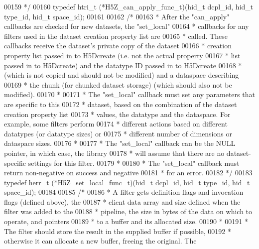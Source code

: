 \begin{DoxyCode}
00159 \textcolor{comment}{ */}
00160 \textcolor{keyword}{typedef} htri\_t (*H5Z\_can\_apply\_func\_t)(hid\_t dcpl\_id, hid\_t type\_id, hid\_t space\_id);
00161 
00162 \textcolor{comment}{/*}
00163 \textcolor{comment}{ * After the "can\_apply" callbacks are checked for new datasets, the "set\_local"}
00164 \textcolor{comment}{ * callbacks for any filters used in the dataset creation property list are}
00165 \textcolor{comment}{ * called.  These callbacks receive the dataset's private copy of the dataset}
00166 \textcolor{comment}{ * creation property list passed in to H5Dcreate (i.e. not the actual property}
00167 \textcolor{comment}{ * list passed in to H5Dcreate) and the datatype ID passed in to H5Dcreate}
00168 \textcolor{comment}{ * (which is not copied and should not be modified) and a dataspace describing}
00169 \textcolor{comment}{ * the chunk (for chunked dataset storage) (which should also not be modified).}
00170 \textcolor{comment}{ *}
00171 \textcolor{comment}{ * The "set\_local" callback must set any parameters that are specific to this}
00172 \textcolor{comment}{ * dataset, based on the combination of the dataset creation property list}
00173 \textcolor{comment}{ * values, the datatype and the dataspace.  For example, some filters perform}
00174 \textcolor{comment}{ * different actions based on different datatypes (or datatype sizes) or}
00175 \textcolor{comment}{ * different number of dimensions or dataspace sizes.}
00176 \textcolor{comment}{ *}
00177 \textcolor{comment}{ * The "set\_local" callback can be the NULL pointer, in which case, the library}
00178 \textcolor{comment}{ * will assume that there are no dataset-specific settings for this filter.}
00179 \textcolor{comment}{ *}
00180 \textcolor{comment}{ * The "set\_local" callback must return non-negative on success and negative}
00181 \textcolor{comment}{ * for an error.}
00182 \textcolor{comment}{ */}
00183 \textcolor{keyword}{typedef} herr\_t (*H5Z\_set\_local\_func\_t)(hid\_t dcpl\_id, hid\_t type\_id, hid\_t space\_id);
00184 
00185 \textcolor{comment}{/*}
00186 \textcolor{comment}{ * A filter gets definition flags and invocation flags (defined above), the}
00187 \textcolor{comment}{ * client data array and size defined when the filter was added to the}
00188 \textcolor{comment}{ * pipeline, the size in bytes of the data on which to operate, and pointers}
00189 \textcolor{comment}{ * to a buffer and its allocated size.}
00190 \textcolor{comment}{ *}
00191 \textcolor{comment}{ * The filter should store the result in the supplied buffer if possible,}
00192 \textcolor{comment}{ * otherwise it can allocate a new buffer, freeing the original.  The}

\end{DoxyCode}

